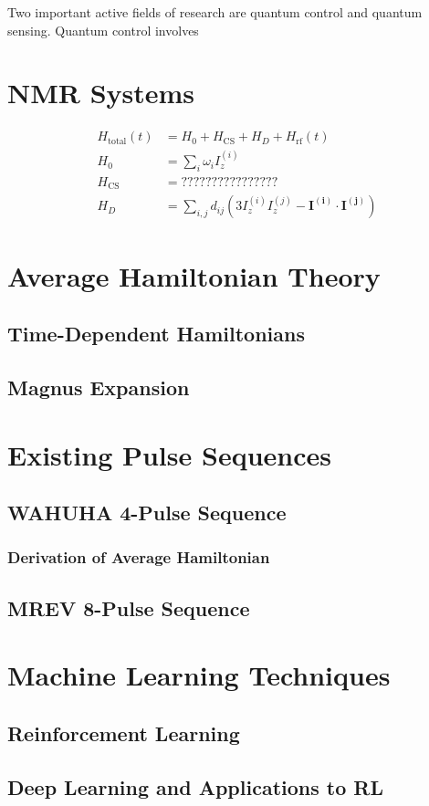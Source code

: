 Two important active fields of research are quantum control and quantum sensing. Quantum control involves

\section{NMR Systems}


\begin{align}\label{eq:nmr-ham}
    H_\text{total}(t) &= H_0 + H_\text{CS} + H_D + H_\text{rf}(t) \\
    H_0 &= \sum_i \omega_i I_z^{(i)} \\
    H_\text{CS} &= ???????????????? \\
    H_D &= \sum_{i,j} d_{ij} \left( 3I_z^{(i)}I_z^{(j)} - \mathbf{I^{(i)}} \cdot \mathbf{I^{(j)}} \right)
\end{align}

\section{Average Hamiltonian Theory}\label{sec:AHT}

\subsection{Time-Dependent Hamiltonians}

\subsection{Magnus Expansion}


\section{Existing Pulse Sequences}

\subsection{WAHUHA 4-Pulse Sequence}

\subsubsection{Derivation of Average Hamiltonian}

\subsection{MREV 8-Pulse Sequence}




\section{Machine Learning Techniques}


\subsection{Reinforcement Learning}


\subsection{Deep Learning and Applications to RL}


